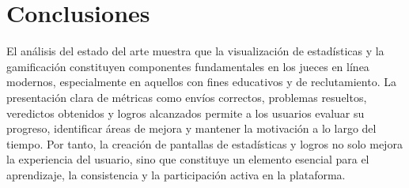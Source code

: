 \section{Conclusiones}

El análisis del estado del arte muestra que la visualización de estadísticas y la gamificación constituyen componentes fundamentales en los jueces en línea modernos, especialmente en aquellos con fines educativos y de reclutamiento. La presentación clara de métricas como envíos correctos, problemas resueltos, veredictos obtenidos y logros alcanzados permite a los usuarios evaluar su progreso, identificar áreas de mejora y mantener la motivación a lo largo del tiempo. Por tanto, la creación de pantallas de estadísticas y logros no solo mejora la experiencia del usuario, sino que constituye un elemento esencial para el aprendizaje, la consistencia y la participación activa en la plataforma.